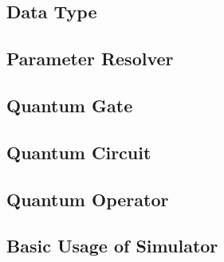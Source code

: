 \documentclass[pra,twocolumn,superscriptaddress,floatfix,nofootinbib,amsmath,amssymb]{revtex4-1}
\begin{document}
\subsection{Data Type}


\subsection{Parameter Resolver}


\subsection{Quantum Gate}


\subsection{Quantum Circuit}


\subsection{Quantum Operator}


\subsection{Basic Usage of Simulator}




% 

% 

% 
\end{document}
